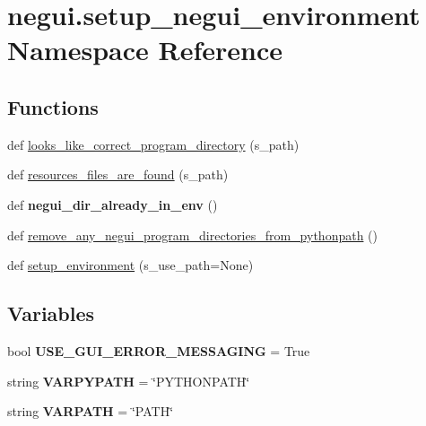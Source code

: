 \hypertarget{namespacenegui_1_1setup__negui__environment}{}\section{negui.\+setup\+\_\+negui\+\_\+environment Namespace Reference}
\label{namespacenegui_1_1setup__negui__environment}
\subsection*{Functions}
\begin{DoxyCompactItemize}
\item 
def \hyperlink{namespacenegui_1_1setup__negui__environment_a3dc373e848bd3191a1850e9885990e55}{looks\+\_\+like\+\_\+correct\+\_\+program\+\_\+directory} (s\+\_\+path)
\item 
def \hyperlink{namespacenegui_1_1setup__negui__environment_a6fe75d5a25f049e0922770c01800bf0f}{resources\+\_\+files\+\_\+are\+\_\+found} (s\+\_\+path)
\item 
def {\bfseries negui\+\_\+dir\+\_\+already\+\_\+in\+\_\+env} ()\hypertarget{namespacenegui_1_1setup__negui__environment_a21e603d4e977920cbd11bc02ffb23a36}{}\label{namespacenegui_1_1setup__negui__environment_a21e603d4e977920cbd11bc02ffb23a36}

\item 
def \hyperlink{namespacenegui_1_1setup__negui__environment_aaedbf956380dc5707c61769abf071c40}{remove\+\_\+any\+\_\+negui\+\_\+program\+\_\+directories\+\_\+from\+\_\+pythonpath} ()
\item 
def \hyperlink{namespacenegui_1_1setup__negui__environment_a22a2451db03931ad081654ab38ad0469}{setup\+\_\+environment} (s\+\_\+use\+\_\+path=None)
\end{DoxyCompactItemize}
\subsection*{Variables}
\begin{DoxyCompactItemize}
\item 
bool {\bfseries U\+S\+E\+\_\+\+G\+U\+I\+\_\+\+E\+R\+R\+O\+R\+\_\+\+M\+E\+S\+S\+A\+G\+I\+NG} = True\hypertarget{namespacenegui_1_1setup__negui__environment_a19b892bf74753eedb02f9e1f46e7f210}{}\label{namespacenegui_1_1setup__negui__environment_a19b892bf74753eedb02f9e1f46e7f210}

\item 
string {\bfseries V\+A\+R\+P\+Y\+P\+A\+TH} = \char`\"{}P\+Y\+T\+H\+O\+N\+P\+A\+TH\char`\"{}\hypertarget{namespacenegui_1_1setup__negui__environment_a4806870c6e5c9723337da87f5fbf950f}{}\label{namespacenegui_1_1setup__negui__environment_a4806870c6e5c9723337da87f5fbf950f}

\item 
string {\bfseries V\+A\+R\+P\+A\+TH} = \char`\"{}P\+A\+TH\char`\"{}\hypertarget{namespacenegui_1_1setup__negui__environment_ac126312749bca284ae7b870e89e3b270}{}\label{namespacenegui_1_1setup__negui__environment_ac126312749bca284ae7b870e89e3b270}

\end{DoxyCompactItemize}


